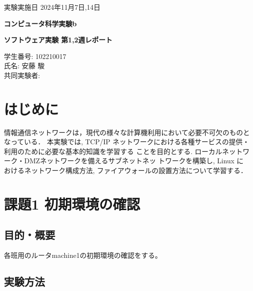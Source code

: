 \documentclass{ltjsarticle} %
\begin{document}
\thispagestyle{empty}
\begin{flushright}
{\large 実験実施日 2024年11月7日,14日{\hspace{5cm}}} 
\end{flushright}

\vspace*{\fill}
\centering
{\Huge\bf コンピュータ科学実験b}
\vspace*{1cm}

{\huge\bf ソフトウェア実験 第1,2週レポート}
\vspace*{\fill}

\vspace*{\fill}

\vspace*{\fill}

\begin{flushright}
{\large 学生番号: 102210017} \\ %
{\large 氏名: 安藤 駿} \\

{\large 共同実験者: } \\
\end{flushright}

\clearpage

\addtocounter{page}{-1}
\raggedright
\setlength{\parindent}{1em}

\section{はじめに}
情報通信ネットワークは，現代の様々な計算機利用において必要不可欠のものとなっている．
本実験では, TCP/IP ネットワークにおける各種サービスの提供・利用のために必要な基本的知識を学習する
ことを目的とする. ローカルネットワーク・DMZネットワークを備えるサブネットネッ
トワークを構築し, Linux におけるネットワーク構成方法, ファイアウォールの設置方法について学習する．


\section{課題1 初期環境の確認}

\subsection{目的・概要}
各班用のルータmachine1の初期環境の確認をする。


\subsection{実験方法}
\end{document}
